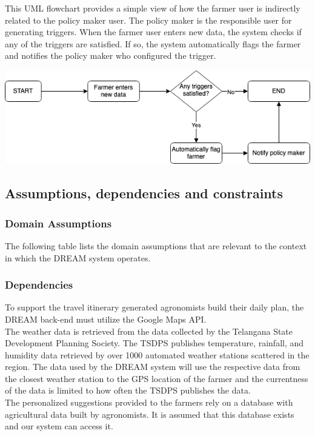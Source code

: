 \begin{flushleft}
This UML flowchart provides a simple view of how the farmer user is indirectly related to the policy maker user. The policy maker is the responsible user for generating triggers. When the farmer user enters new data, the system checks if any of the triggers are satisfied. If so, the system automatically flags the farmer and notifies the policy maker who configured the trigger. 
\end{flushleft}
\begin{center}
\includegraphics[scale=0.4]{../images_diagrams/newfarmerdata_trigger.png}
\end{center}


\subsection{Assumptions, dependencies and constraints}
\subsubsection{Domain Assumptions}
\begin{flushleft}
The following table lists the domain assumptions that are relevant to the context in which the DREAM system operates. 
\end{flushleft} 

\begin{flushleft}

\end{flushleft}

\subsubsection{Dependencies}
\begin{flushleft}
To support the travel itinerary generated agronomists build their daily plan, the DREAM back-end must utilize the Google Maps API. \\
\smallskip 
The weather data is retrieved from the data collected by the Telangana State Development Planning Society. The TSDPS publishes temperature, rainfall, and humidity data retrieved by over 1000 automated weather stations scattered in the region. The data used by the DREAM system will use the respective data from the closest weather station to the GPS location of the farmer and the currentness of the data is limited to how often the TSDPS publishes the data. \\
\smallskip
The personalized suggestions provided to the farmers rely on a database with agricultural data built by agronomists. It is assumed that this database exists and our system can access it. \\
\end{flushleft}

